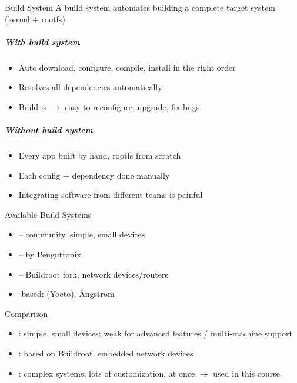 \begin{concept}{Build System}
    A build system automates building a complete target system (kernel + rootfs).
    \subparagraph{With build system}
    \begin{itemize}
        \item Auto download, configure, compile, install in the right order
        \item Resolves all dependencies automatically
        \item Build is  $\rightarrow$ easy to reconfigure,
              upgrade, fix bugs
    \end{itemize}
    \subparagraph{Without build system}
    \begin{itemize}
        \item Every app built by hand, rootfs from scratch
        \item Each config + dependency done manually
        \item Integrating software from different teams is painful
    \end{itemize}
    \multend
\end{concept}


\begin{definition}{Available Build Systems}
    \begin{itemize}
        \item {} -- community, simple, small devices
        \item {} -- by Pengutronix
        \item {} -- Buildroot fork, network devices/routers
        \item {}-based:  (Yocto), Ångström
    \end{itemize}
\end{definition}

\begin{corollary}{Comparison}
    \begin{itemize}
        \item {}: simple, small devices; weak for advanced
              features / multi-machine support
        \item {}: based on Buildroot, embedded network devices
        \item {}: complex systems, lots of customization,
               at once $\rightarrow$ used in this course
    \end{itemize}
\end{corollary}

